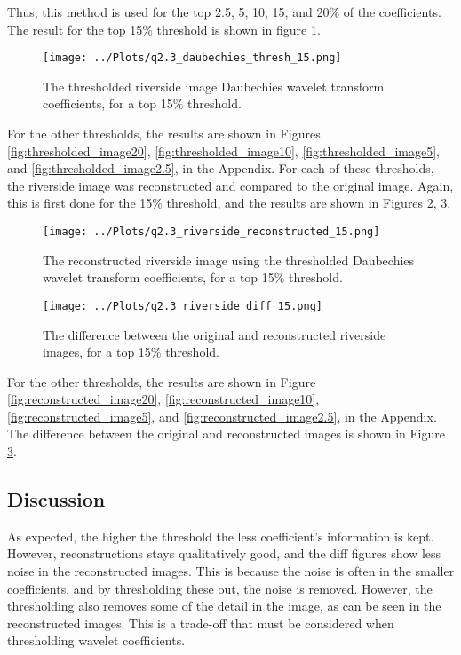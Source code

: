 \documentclass[12pt]{report} %
\begin{document}
Thus, this method is used for the top 2.5, 5, 10, 15, and 20\% of the coefficients. The result for the top 15\% threshold is shown in figure \ref{fig:thresholded_image15}.

\begin{figure}[htbp]
    \centering
    \texttt{[image: ../Plots/q2.3\_daubechies\_thresh\_15.png]}
    \caption{The thresholded riverside image Daubechies wavelet transform coefficients, for a top 15\% threshold.}
    \label{fig:thresholded_image15}
\end{figure}

For the other thresholds, the results are shown in Figures \ref{fig:thresholded_image20}, \ref{fig:thresholded_image10},  \ref{fig:thresholded_image5}, and \ref{fig:thresholded_image2.5}, in the Appendix. For each of these thresholds, the riverside image was reconstructed and compared to the original image. Again, this is first done for the 15\% threshold, and the results are shown in Figures \ref{fig:reconstructed_image15}, \ref{fig:diff_image15}.

\begin{figure}[htbp]
    \centering
    \texttt{[image: ../Plots/q2.3\_riverside\_reconstructed\_15.png]}
    \caption{The reconstructed riverside image using the thresholded Daubechies wavelet transform coefficients, for a top 15\% threshold.}
    \label{fig:reconstructed_image15}
\end{figure}

\begin{figure}[htbp]
    \centering
    \texttt{[image: ../Plots/q2.3\_riverside\_diff\_15.png]}
    \caption{The difference between the original and reconstructed riverside images, for a top 15\% threshold.}
    \label{fig:diff_image15}
\end{figure}


For the other thresholds, the results are shown in Figure \ref{fig:reconstructed_image20}, \ref{fig:reconstructed_image10},  \ref{fig:reconstructed_image5}, and \ref{fig:reconstructed_image2.5}, in the Appendix. The difference between the original and reconstructed images is shown in Figure \ref{fig:diff_image15}.


\subsection{Discussion}

As expected, the higher the threshold the less coefficient's information is kept. However, reconstructions stays qualitatively good, and the diff figures show less noise in the reconstructed images. This is because the noise is often in the smaller coefficients, and by thresholding these out, the noise is removed. However, the thresholding also removes some of the detail in the image, as can be seen in the reconstructed images. This is a trade-off that must be considered when thresholding wavelet coefficients.
\end{document}
